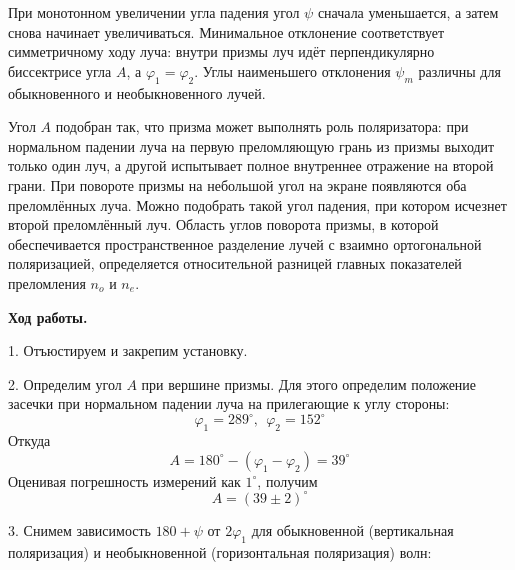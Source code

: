 \documentclass[14pt]{article}
\begin{document}
При монотонном увеличении угла падения угол
$\psi$ сначала уменьшается, а затем снова начинает увеличиваться. Минимальное отклонение
соответствует симметричному ходу луча: внутри призмы луч идёт перпендикулярно
биссектрисе угла $A$, а $\varphi_1 = \varphi_2$. Углы наименьшего отклонения
$\psi_m$ различны для обыкновенного и необыкновенного лучей.

Угол $A$ подобран так, что призма может выполнять роль поляризатора:
при нормальном падении луча на первую преломляющую грань
из призмы выходит только один луч, а другой испытывает полное внутреннее
отражение на второй грани. При повороте призмы на небольшой угол на экране появляются оба преломлённых луча. Можно подобрать
такой угол падения, при котором исчезнет второй преломлённый
луч. Область углов поворота призмы, в которой обеспечивается пространственное
разделение лучей с взаимно ортогональной поляризацией, определяется относительной разницей главных показателей преломления
$n_o$ и $n_e$.

\newpage
\textbf{Ход работы.}

1. Отъюстируем и закрепим установку.

2. Определим угол $A$ при вершине призмы. Для этого определим положение засечки при нормальном падении луча на прилегающие к углу стороны:
$$
	\varphi_1 = 289^\circ,~~\varphi_2 = 152^\circ
$$
Откуда
$$
	A = 180^\circ - (\varphi_1 - \varphi_2) = 39^\circ
$$
Оценивая погрешность измерений как $1^\circ$, получим
$$
	A = (39 \pm 2)^\circ
$$

3. Снимем зависимость $180+\psi$ от $2\varphi_1$ для обыкновенной (вертикальная поляризация) и необыкновенной (горизонтальная поляризация) волн:
\end{document}
